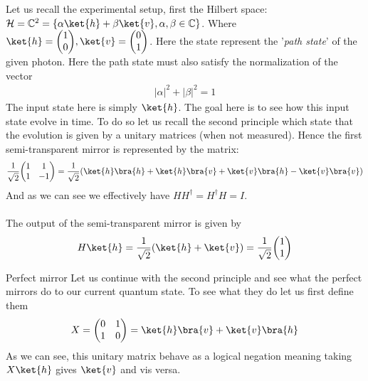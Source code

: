     Let us recall the experimental setup, first the Hilbert space: $\mathcal{H} = \mathbb{C}^2 = \left\{\alpha \ket{h} + \beta \ket{v}, \alpha, \beta \in \mathbb{C}\right\}$. Where $\ket{h} = \begin{pmatrix} 1 \\ 0 \end{pmatrix} , \ket{v} = \begin{pmatrix} 0 \\ 1 \end{pmatrix}$. Here the state represent the '\textit{path state}' of the given photon. Here the path state must also satisfy the normalization of the vector 
	\begin{align*} 
		\left|\alpha\right|^2 + \left|\beta\right|^2 = 1 
	\end{align*}
	The input state here is simply $\ket{h}$. The goal here is to see how this input state evolve in time. To do so let us recall the second principle which state that the evolution is given by a unitary matrices (when not measured). Hence the first semi-transparent mirror is represented by the  matrix:
	\begin{align*} 
		\frac{1}{\sqrt{2}}\begin{pmatrix} 1 & 1 \\ 1 & -1 \end{pmatrix}  = \frac{1}{\sqrt{2}} \left(\ket{h}\bra{h} + \ket{h}\bra{v} + \ket{v}\bra{h} - \ket{v}\bra{v}\right)
	\end{align*}
	And as we can see we effectively have $H H^{\dagger} = H^{\dagger} H = I$. \\
	$ $\\
	The output of the semi-transparent mirror is given by 
	\begin{align*} 
		H \ket{h}  = \frac{1}{\sqrt{2}} \left(\ket{h} + \ket{v} \right) = \frac{1}{\sqrt{2}} \begin{pmatrix} 1 \\ 1 \end{pmatrix} 
	\end{align*}
	\begin{parag}{Perfect mirror}
	Let us continue with the second principle and see what the perfect mirrors do to our current quantum state. To see what they do let us first define them 
	\begin{align*} 
		X = \begin{pmatrix} 0 & 1 \\ 1 & 0 \end{pmatrix}   = \ket{h}\bra{v} + \ket{v}\bra{h}
	\end{align*}
	As we can see, this unitary matrix behave as a logical negation meaning taking $X \ket{h}$ gives $\ket{v}$ and vis versa.
	\end{parag}
